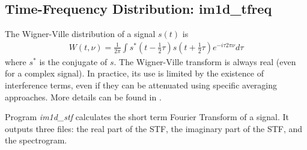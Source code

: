 \subsection{Time-Frequency Distribution: im1d\_tfreq}


The Wigner-Ville 
distribution \cite{ima:wigner32,ima:ville48} of a signal $s(t)$ is 
\begin{eqnarray}
W(t, \nu) = \frac{1}{2\pi} \int s^*(t - \frac{1}{2}\tau ) 
           s(t + \frac{1}{2}\tau ) e^{-i\tau 2 \pi \nu} d\tau
\end{eqnarray}
where $s^*$ is the conjugate of $s$.  
The Wigner-Ville transform is always real (even for a complex signal).
In practice, its use is limited by the existence of interference terms,
even if they can be attenuated using specific averaging approaches.
More details can be found in \cite{ima:cohen95,ima:mallat98}.

% 

Program {\em im1d\_stf} calculates the short term Fourier Transform of a signal.
It outputs three files: the real part of the STF,  the imaginary part
of the STF, and the spectrogram.

